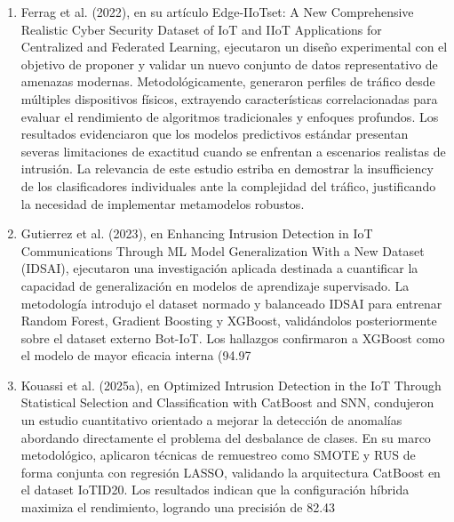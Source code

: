 \begin{enumerate}
\item Ferrag et al. (2022), en su artículo Edge-IIoTset: A New Comprehensive Realistic Cyber Security Dataset of IoT and IIoT Applications for Centralized and Federated Learning, ejecutaron un diseño experimental con el objetivo de proponer y validar un nuevo conjunto de datos representativo de amenazas modernas. Metodológicamente, generaron perfiles de tráfico desde múltiples dispositivos físicos, extrayendo características correlacionadas para evaluar el rendimiento de algoritmos tradicionales y enfoques profundos. Los resultados evidenciaron que los modelos predictivos estándar presentan severas limitaciones de exactitud cuando se enfrentan a escenarios realistas de intrusión. La relevancia de este estudio estriba en demostrar la insufficiency de los clasificadores individuales ante la complejidad del tráfico, justificando la necesidad de implementar metamodelos robustos.

\item Gutierrez et al. (2023), en Enhancing Intrusion Detection in IoT Communications Through ML Model Generalization With a New Dataset (IDSAI), ejecutaron una investigación aplicada destinada a cuantificar la capacidad de generalización en modelos de aprendizaje supervisado. La metodología introdujo el dataset normado y balanceado IDSAI para entrenar Random Forest, Gradient Boosting y XGBoost, validándolos posteriormente sobre el dataset externo Bot-IoT. Los hallazgos confirmaron a XGBoost como el modelo de mayor eficacia interna (94.97%

\item Kouassi et al. (2025a), en Optimized Intrusion Detection in the IoT Through Statistical Selection and Classification with CatBoost and SNN, condujeron un estudio cuantitativo orientado a mejorar la detección de anomalías abordando directamente el problema del desbalance de clases. En su marco metodológico, aplicaron técnicas de remuestreo como SMOTE y RUS de forma conjunta con regresión LASSO, validando la arquitectura CatBoost en el dataset IoTID20. Los resultados indican que la configuración híbrida maximiza el rendimiento, logrando una precisión de 82.43%


\end{enumerate}
